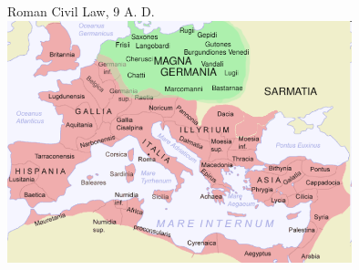 \begin{frame}{Roman Civil Law, 9 A. D.}
    \centering
    \includegraphics[width=0.75\textwidth]{img/europe-map.png} \\
\end{frame}

